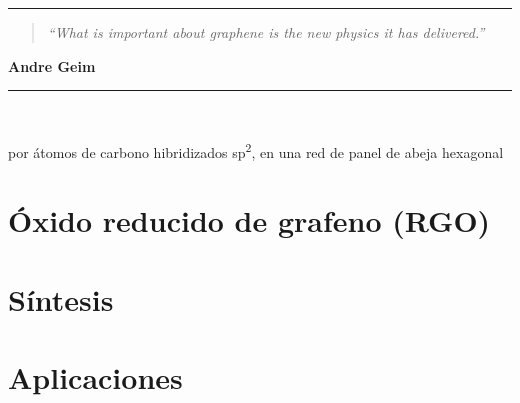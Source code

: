 \noindent
\rule{\linewidth}{1 pt}
\begin{flushright}
	\begin{quotation}
		\small{
			\textit{``What is important about graphene is the new physics it has delivered.''}}
	\end{quotation}
	\bf{Andre Geim}
\end{flushright}
\noindent
\rule{\linewidth}{1 pt}\\
\vfill

 por átomos de carbono hibridizados sp\textsuperscript{2}, en una red de panel de abeja hexagonal \cite{Novoselov2004,Balandin2008,Bolotin2008,Bonaccorso2010,Lee2008}
\section{Óxido reducido de grafeno (RGO)}

\section{Síntesis}

\section{Aplicaciones}